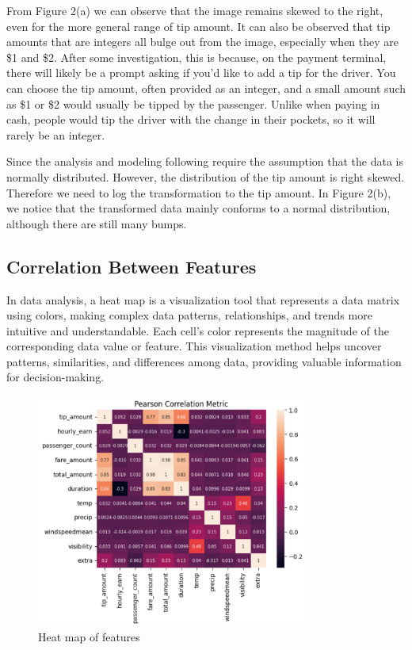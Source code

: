\documentclass[11pt]{article}
\begin{document}
From Figure 2(a) we can observe that the image remains skewed to the right, even for the more general range of tip amount. It can also be observed that tip amounts that are integers all bulge out from the image, especially when they are \$1 and \$2. After some investigation, this is because, on the payment terminal, there will likely be a prompt asking if you'd like to add a tip for the driver. You can choose the tip amount, often provided as an integer, and a small amount such as \$1 or \$2 would usually be tipped by the passenger. Unlike when paying in cash, people would tip the driver with the change in their pockets, so it will rarely be an integer. 

Since the analysis and modeling following require the assumption that the data is normally distributed. However, the distribution of the tip amount is right skewed. Therefore we need to log the transformation to the tip amount. In Figure 2(b), we notice that the transformed data mainly conforms to a normal distribution, although there are still many bumps.

\subsection{Correlation Between Features}

In data analysis, a  heat map is a visualization tool that represents a data matrix using colors, making complex data patterns, relationships, and trends more intuitive and understandable.  Each cell's color represents the magnitude of the corresponding data value or feature. This visualization method helps uncover patterns, similarities, and differences among data, providing valuable information for decision-making.

\begin{figure}[h]
    \includegraphics[width=0.8\textwidth]{heatmap.png}
    \centering
    \caption{Heat map of features} %
\end{figure}
\end{document}
